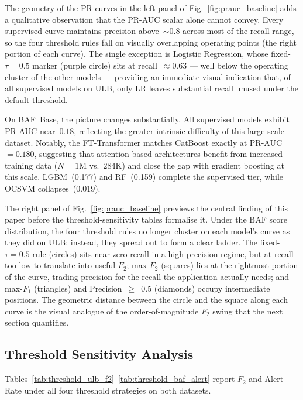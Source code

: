 \documentclass[a4paper,fleqn]{cas-sc}
\begin{document}
The geometry of the PR curves in the left panel of Fig.~\ref{fig:prauc_baseline} adds a
qualitative observation that the PR-AUC scalar alone cannot convey. Every supervised
curve maintains precision above~$\sim$0.8 across most of the recall range, so the four
threshold rules fall on visually overlapping operating points (the right portion of
each curve). The single exception is Logistic Regression, whose fixed-$\tau{=}0.5$
marker (purple circle) sits at recall~$\approx$0.63 --- well below the operating
cluster of the other models --- providing an immediate visual indication that, of all
supervised models on ULB, only LR leaves substantial recall unused under the default
threshold.

On BAF~Base, the picture changes substantially. All supervised models exhibit PR-AUC
near~$0.18$, reflecting the greater intrinsic difficulty of this large-scale dataset.
Notably, the FT-Transformer matches CatBoost exactly at PR-AUC~$=0.180$, suggesting
that attention-based architectures benefit from increased training data ($N\!=\!1$M
vs.\ $284$K) and close the gap with gradient boosting at this scale. LGBM~(0.177) and
RF~(0.159) complete the supervised tier, while OCSVM collapses~(0.019).

The right panel of Fig.~\ref{fig:prauc_baseline} previews the central finding of this
paper before the threshold-sensitivity tables formalise it. Under the BAF score
distribution, the four threshold rules no longer cluster on each model's curve as they
did on ULB; instead, they spread out to form a clear ladder. The fixed-$\tau{=}0.5$ rule
(circles) sits near zero recall in a high-precision regime, but at recall too low to
translate into useful $F_2$; max-$F_2$ (squares) lies at the rightmost portion of the
curve, trading precision for the recall the application actually needs; and max-$F_1$
(triangles) and Precision~$\geq$~0.5 (diamonds) occupy intermediate positions. The
geometric distance between the circle and the square along each curve is the visual
analogue of the order-of-magnitude $F_2$ swing that the next section quantifies.

\subsection{Threshold Sensitivity Analysis}
\label{subsec:threshold_results}

Tables~\ref{tab:threshold_ulb_f2}--\ref{tab:threshold_baf_alert} report $F_2$ and Alert
Rate under all four threshold strategies on both datasets.
\end{document}
